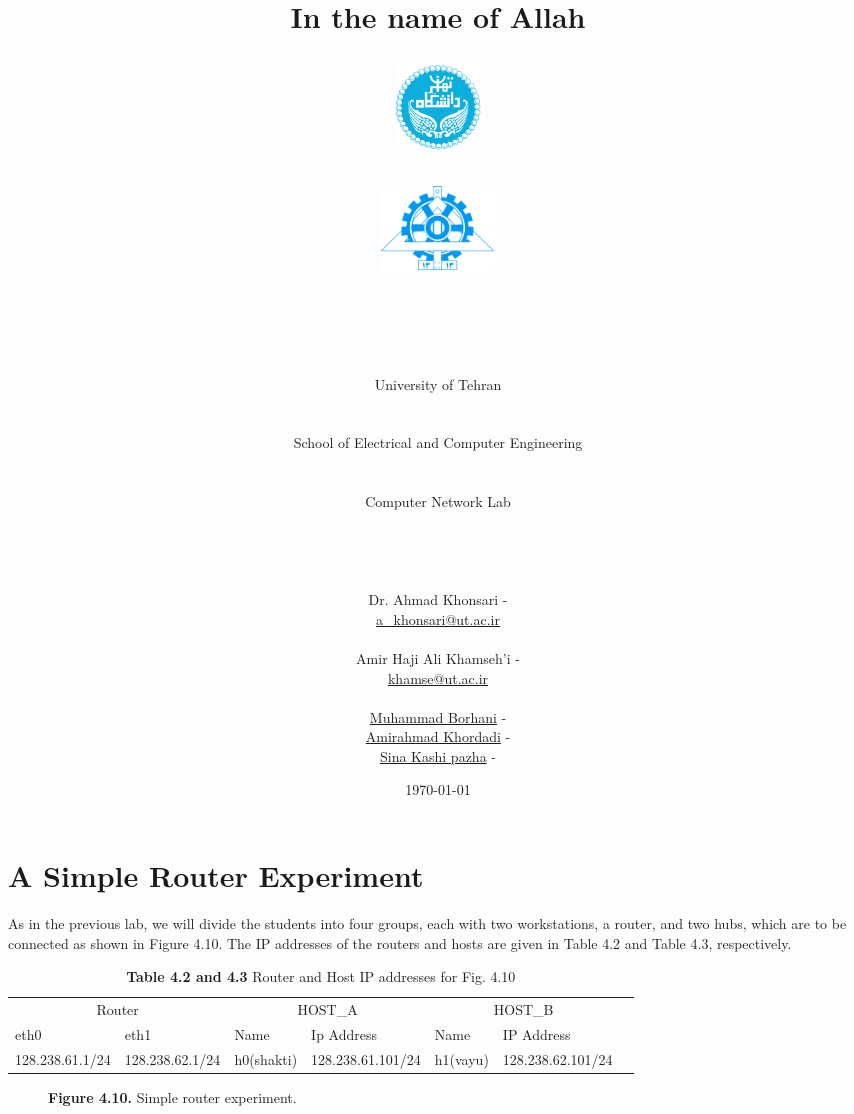 \documentclass[10pt,a4paper]{article}
\title{
\normalsize In the name of Allah\\
\vspace{10pt}
\LARGE\FR{بسم \allah\  الرحمن الرحیم}
\vspace{10pt}
\begin{center}
    \begin{minipage}{0.48\textwidth}
        \begin{flushleft}
            \includegraphics[height=64pt,width=64pt]{../img/logo.png}
        \end{flushleft}
    \end{minipage}
    \begin{minipage}{0.48\textwidth}
        \begin{flushright}
            \includegraphics[height=64pt]{../img/eng-logo.png}
        \end{flushright}
    \end{minipage}
\end{center}
\vspace*{-64pt}
\huge \titleText\\
\vspace{40pt}
}
\author{
	\huge University of Tehran\\
    \LARGE \FR{دانشگاه تهران}\\\\
    \LARGE School of Electrical and Computer Engineering\\
    \FR{دانشکده مهندسی برق و کامپیوتر}\\\\
    \Large Computer Network Lab\\
    \FR{آزمایشگاه شبکه‌های کامپیوتری}\\\\\\\\
    \normalfont
    Dr. Ahmad Khonsari - \FR{احمد خونساری}\\
    \href{mailto:a_khonsari@ut.ac.ir}{a\_khonsari@ut.ac.ir}\\\\
    \normalsize
    Amir Haji Ali Khamseh'i - \FR{امیر حاجی علی خمسه‌ء}\\
    \href{mailto:khamse@ut.ac.ir}{khamse@ut.ac.ir}\\\\
    \normalsize \href{mailto:m.borhani@ut.ac.ir}{Muhammad Borhani} - \FR{محمد برهانی}\\
	\normalsize \href{mailto:a.a.khordadi@ut.ac.ir}{Amirahmad Khordadi} - \FR{امیر احمد خردادی}\\
	\normalsize \href{mailto:sina\_kashipazha@ut.ac.ir}{Sina Kashi pazha} - \FR{سینا کاشی پزها}\\
}
\date{\vspace{30pt}\today\\\vspace{10pt}{\selectlanguage{farsi}\today}}
\numberwithin{equation}{section}
\numberwithin{figure}{section}
\numberwithin{table}{section}
\begin{document}

    \maketitle


    \pagebreak

\section*{A Simple Router Experiment}
    As in the previous lab, we will divide the students into four groups, each with two workstations, a router, and two hubs, which are to be connected as shown in Figure 4.10.
    The IP addresses of the routers and hosts are given in Table 4.2 and Table 4.3, respectively.
    \begin{table}[H]
        \caption{\textbf{Table 4.2 and 4.3} Router and Host IP addresses for Fig. 4.10}
        \vspace{5pt}
        \centering
        \large
        \begin{tabular}{ *7l }
            \hline \hline
            \multicolumn{2}{c}{Router} & \multicolumn{2}{c}{HOST\_A} & \multicolumn{2}{c}{HOST\_B} \\
            eth0 & eth1 & Name & Ip Address & Name & IP Address \\
            \hline 
            128.238.61.1/24 & 128.238.62.1/24 & h0(shakti) & 128.238.61.101/24 & h1(vayu) & 128.238.62.101/24 \\
            \hline \hline
            \end{tabular}
    \end{table}

    \begin{figure}[H]
        \centering
        \caption{\textbf{Figure 4.10.} Simple router experiment.}        
    \end{figure}
\end{document}
